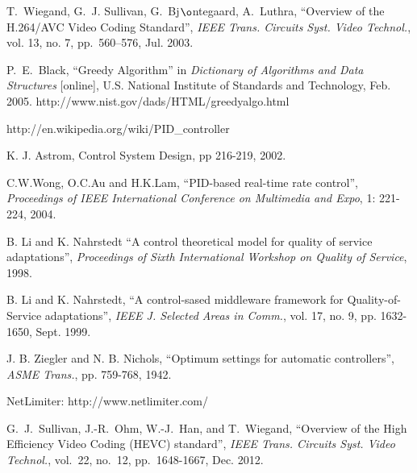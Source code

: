 \documentclass[journal]{IEEEtran}
\begin{document}
\begin{thebibliography}{1}
T.~Wiegand, G.~J. Sullivan, G.~Bj$\o$ntegaard, A.~Luthra, ``Overview of the H.264/AVC Video Coding Standard'', {\em IEEE Trans. Circuits Syst. Video Technol.}, vol. 13, no. 7, pp.~560--576, Jul. 2003.

P.~E.~Black, ``Greedy Algorithm'' in {\em Dictionary of Algorithms and Data Structures} [online], U.S. National Institute of Standards and Technology, Feb. 2005.
\newblock http://www.nist.gov/dads/HTML/greedyalgo.html

http://en.wikipedia.org/wiki/PID\_controller

K. J. Astrom, Control System Design, pp 216-219, 2002.

C.W.Wong, O.C.Au and H.K.Lam, ``PID-based real-time rate control'', {\em Proceedings of IEEE International Conference on Multimedia and Expo}, 1: 221-224, 2004.

B. Li and K. Nahrstedt  ``A control theoretical model for quality of service adaptations'', {\em Proceedings of Sixth International Workshop on Quality of Service}, 1998.

B. Li and K. Nahrstedt, ``A control-sased middleware framework for Quality-of-Service adaptations'', {\em IEEE J. Selected Areas in Comm.}, vol. 17, no. 9, pp. 1632-1650, Sept. 1999.

J. B. Ziegler and N. B. Nichols, ``Optimum settings for automatic controllers'', {\em ASME Trans.}, pp. 759-768, 1942.

NetLimiter: http://www.netlimiter.com/

G.~J.~Sullivan, J.-R.~Ohm, W.-J.~Han, and T.~Wiegand, ``Overview of the High Efficiency Video Coding (HEVC) standard'', {\em IEEE Trans. Circuits Syst. Video Technol.}, vol.~22, no.~12, pp.~1648-1667, Dec. 2012. 

\end{thebibliography}



% 
\end{document}
